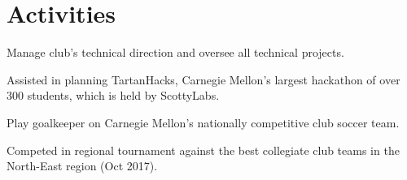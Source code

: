 \documentclass[]{resume-font}
\begin{document}
\begin{minipage}[t]{0.59\textwidth}
\sectionsep


\section{Activities} 
\begin{tightemize}
    \item Manage club's technical direction and oversee all technical projects.
    \item Assisted in planning TartanHacks, Carnegie Mellon's largest hackathon of over 300 students, which is held by ScottyLabs.
\end{tightemize}

\sectionsep

\begin{tightemize}
    \item Play goalkeeper on Carnegie Mellon's nationally competitive club soccer team.
    \item Competed in regional tournament against the best collegiate club teams in the North-East region (Oct 2017).
\end{tightemize}

\sectionsep

\end{minipage} 
\end{document}
